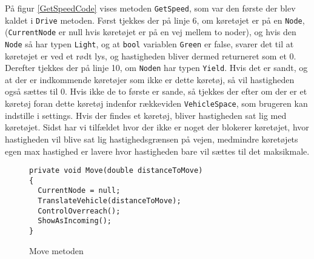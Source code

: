 På figur \ref{GetSpeedCode} vises metoden \texttt{GetSpeed}, som var den første der blev kaldet i \texttt{Drive} metoden. Først tjekkes der på linje 6, om køretøjet er på en \texttt{Node}, (\texttt{CurrentNode} er null hvis køretøjet er på en vej mellem to noder), og hvis den \texttt{Node} så har typen \texttt{Light}, og at \texttt{bool} variablen \texttt{Green} er false, svarer det til at køretøjet er ved et rødt lys, og hastigheden bliver dermed returneret som et 0. Derefter tjekkes der på linje 10, om \texttt{Noden} har typen \texttt{Yield}. Hvis det er sandt, og at der er indkommende køretøjer som ikke er dette køretøj, så vil hastigheden også sættes til 0. Hvis ikke de to første er sande, så tjekkes der efter om der er et køretøj foran dette køretøj indenfor rækkeviden \texttt{VehicleSpace}, som brugeren kan indstille i settings. Hvis der findes et køretøj, bliver hastigheden sat lig med køretøjet. Sidst har vi tilfældet hvor der ikke er noget der blokerer køretøjet, hvor hastigheden vil blive sat lig hastighedsgrænsen på vejen, medmindre køretøjets egen max hastighed er lavere hvor hastigheden bare vil sættes til det maksikmale.

\begin{figure}[H]
\begin{lstlisting}
private void Move(double distanceToMove)
{
  CurrentNode = null;
  TranslateVehicle(distanceToMove);
  ControlOverreach();
  ShowAsIncoming();
}
\end{lstlisting}
\caption{Move metoden}\label{MoveCode}
\end{figure}